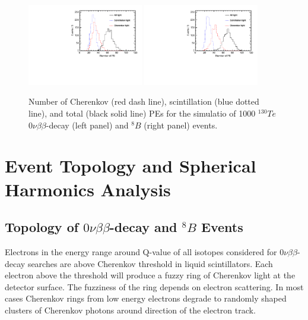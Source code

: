 \documentclass[12pt,twoside,letterpaper]{article}
\newcommand{\vbb}{0\nu\beta\beta}
\newcommand{\Te}{^{130}Te}
\newcommand{\B}{^{8}B}
\begin{document}
\begin{figure}[htb]
\centering
\includegraphics[angle=0,width=0.45\textwidth]{plots/hMomNPhot_Te130.pdf}
\includegraphics[angle=0,width=0.45\textwidth]{plots/hMomNPhot_1el_2p529MeV.pdf}
\caption{Number of Cherenkov (red dash line), scintillation (blue dotted line), and total (black solid line) PEs for the simulatio of 1000 $\Te$ $\vbb$-decay (left panel) and $\B$ (right panel) events.}
\label{fig:NPhot}
\end{figure}


\section{Event Topology and Spherical Harmonics Analysis}
\label{sec:topology_and_harmonics}

\subsection{Topology of $\vbb$-decay and $\B$ Events}
\label{subsec:topology}

Electrons in the energy range around Q-value of all isotopes considered for $\vbb$-decay searches are above Cherenkov threshold in liquid scintillators. Each electron above the threshold will produce a fuzzy ring of Cherenkov light at the detector surface. The fuzziness of the ring depends on electron scattering. In most cases Cherenkov rings from low energy electrons degrade to randomly shaped clusters of Cherenkov photons around direction of the electron track. 
\end{document}
